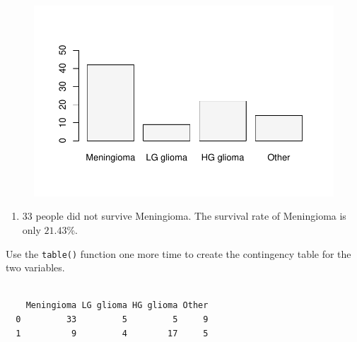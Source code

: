 \documentclass[
  letterpaper,
  DIV=11,
  numbers=noendperiod]{scrreprt}
\newenvironment{Shaded}{\begin{snugshade}}{\end{snugshade}}
\newcommand{\FunctionTok}[1]{\textcolor[rgb]{0.28,0.35,0.67}{#1}}
\newcommand{\NormalTok}[1]{\textcolor[rgb]{0.00,0.23,0.31}{#1}}
\newcommand{\OtherTok}[1]{\textcolor[rgb]{0.00,0.23,0.31}{#1}}
\newcommand{\SpecialCharTok}[1]{\textcolor[rgb]{0.37,0.37,0.37}{#1}}
\providecommand{\tightlist}{%
  \setlength{\itemsep}{0pt}\setlength{\parskip}{0pt}}\usepackage{longtable,booktabs,array}
\begin{document}
\begin{figure}[H]

{\centering \includegraphics{./03-DescriptiveII_files/figure-pdf/unnamed-chunk-3-1.pdf}

}

\end{figure}

\begin{blackbox}

\begin{enumerate}
\def\labelenumi{\arabic{enumi}.}
\setcounter{enumi}{2}
\tightlist
\item
  \(33\) people did not survive Meningioma. The survival rate of
  Meningioma is only \(21.43\)\%.
\end{enumerate}

\end{blackbox}

Use the \texttt{table()} function one more time to create the
contingency table for the two variables.

\begin{Shaded}
\end{Shaded}

\begin{verbatim}
   
    Meningioma LG glioma HG glioma Other
  0         33         5         5     9
  1          9         4        17     5
\end{verbatim}
\end{document}
